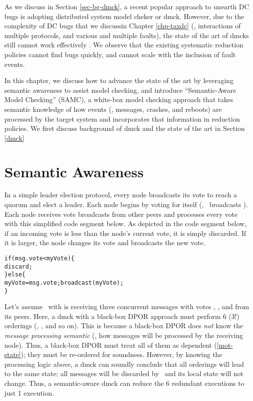 
As we discuss in Section \ref{sec-bg-dmck}, a recent popular approach to unearth
DC bugs is adopting distributed system model cheker or dmck. However, due to the
complexity of DC bugs that we discussin Chapter \ref{chp-taxdc} (\eg,
interactions of multiple protocols, and various and multiple faults), the state
of the art of dmcks still cannot work effectively . We observe that the existing systematic reduction policies
cannot find bugs quickly, and cannot scale with the inclusion of fault events.

In this chapter, we discuss how to advance the state of the art by leveraging
semantic awareness to assist model checking, and introduce ``Semantic-Aware
Model Checking'' (SAMC), a white-box model checking approach that takes semantic
knowledge of how events (\eg, messages, crashes, and reboots) are processed by
the target system and incorporates that information in reduction policies. We
first discuss background of dmck and the state of the art in Section \ref{dmck}


\section{Semantic Awareness}

In a simple leader election protocol, every node broadcasts its vote to reach a
quorum and elect a leader.  Each node begins by voting for itself (\eg, \ntwo\
broadcasts ).  Each node receives vote broadcasts from other peers
and processes every vote with this simplified code segment below.  As depicted
in the code segment below, if an incoming vote is less than the node's current
vote, it is simply discarded.  If it is larger, the node changes its vote and
broadcasts the new vote.

\begin{alltt}
if (msg.vote < myVote) \{
  discard;
\} else \{
  myVote = msg.vote; broadcast(myVote);
\}
\end{alltt}

Let's assume \nfour\ with  is receiving three concurrent messages
with votes \ts{1}, \ts{2}, and \ts{3} from its peers.  Here, a dmck with a
black-box DPOR approach must perform 6 (3!) orderings (\ts{123}, \ts{132}, and
so on).  This is because a black-box DPOR does {\em not} know the {\em message
processing semantic} (\ie, how messages will be processed by the receiving
node).  Thus, a black-box DPOR must treat all of them as dependent
(\sec\ref{mot-state}); they must be re-ordered for soundness.  However, by
knowing the processing logic above, a dmck can soundly conclude that all
orderings will lead to the same state; all messages will be discarded by \nfour\
and its local state will not change.  Thus, a semantic-aware dmck can reduce the
6 redundant executions to just 1 execution.

